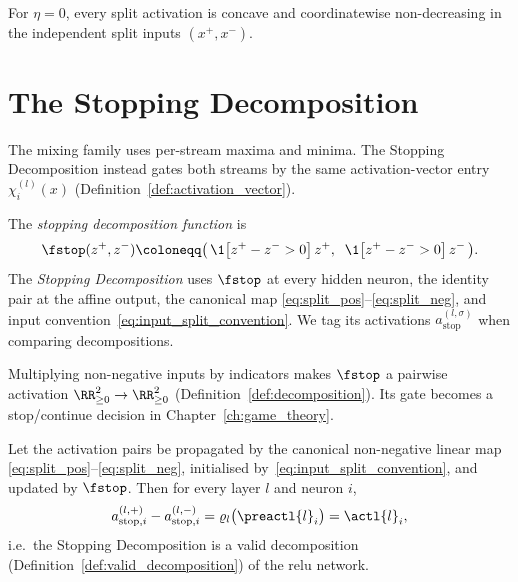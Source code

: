 \begin{remark}[The $\eta=0$ endpoint]\label{rem:eta_zero_extreme}
For $\eta=0$, every split activation is concave and coordinatewise non-decreasing in the independent split inputs $(x^+,x^-)$.
\end{remark}

\section{The Stopping Decomposition}\label{sec:stopping_decomposition}

The mixing family uses per-stream maxima and minima. The Stopping Decomposition instead gates both streams by the same activation-vector entry $\chi_i^{(l)}(x)$ (Definition~\ref{def:activation_vector}).

\begin{definition}\label{def:fstop}
The \emph{stopping decomposition function} is
\begin{equation}
	\fstop(z^+, z^-) \coloneqq \bigl(\, \1\bigl[z^+ - z^- > 0\bigr]\, z^+, \;\; \1\bigl[z^+ - z^- > 0\bigr]\, z^- \,\bigr).
	\label{eq:fstop_def}
\end{equation}
The \emph{Stopping Decomposition} uses $\fstop$ at every hidden neuron, the identity pair at the affine output, the canonical map \eqref{eq:split_pos}--\eqref{eq:split_neg}, and input convention~\eqref{eq:input_split_convention}. We tag its activations $a_{\mathrm{stop}}^{(l,\sigma)}$ when comparing decompositions.
\end{definition}

Multiplying non-negative inputs by indicators makes $\fstop$ a pairwise activation $\RR^2_{\ge 0}\to\RR^2_{\ge 0}$ (Definition~\ref{def:decomposition}). Its gate becomes a stop/continue decision in Chapter~\ref{ch:game_theory}.

\begin{theoremenv}\label{thm:stopping_validity}
Let the activation pairs be propagated by the canonical non-negative linear map \eqref{eq:split_pos}--\eqref{eq:split_neg}, initialised by~\eqref{eq:input_split_convention}, and updated by $\fstop$. Then for every layer $l$ and neuron $i$,
\begin{equation}
	a_{\mathrm{stop},i}^{(l,+)} - a_{\mathrm{stop},i}^{(l,-)} = \varrho_l\bigl(\preactl{l}_i\bigr) = \actl{l}_i,
	\label{eq:stopping_recovery}
\end{equation}
i.e.\ the Stopping Decomposition is a valid decomposition (Definition~\ref{def:valid_decomposition}) of the \ac{relu} network.\end{theoremenv}

